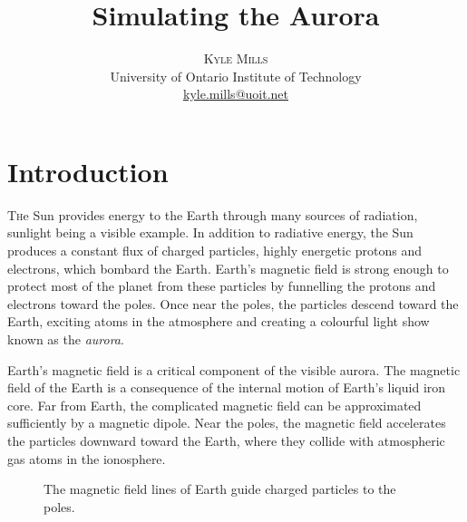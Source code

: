 \documentclass[twocolumn]{article}
\title{\vspace{-15mm}\fontsize{20pt}{10pt}\selectfont\textbf{Simulating the Aurora}} %
\author{
\large
\textsc{Kyle Mills}\\[2mm] %
\normalsize University of Ontario Institute of Technology \\ %
\normalsize \href{mailto:kyle.mills@uoit.net}{kyle.mills@uoit.net} %
\vspace{-5mm}
}
\date{}
\renewcommand{\insertfigure}[3]{\begin{figure}[tbh]
\centering
	\makebox[\columnwidth][c]{
	\texttt{[image: \#1]}
	}
\caption{#3}
\label{#1}
\end{figure}}
\begin{document}
\thispagestyle{fancy} %







\section*{Introduction}
\lettrine[nindent=0em,lines=2]{T}he Sun provides energy to the Earth through many sources of radiation, sunlight being a visible example.  In addition to radiative energy, the Sun produces a constant flux of charged particles, highly energetic protons and electrons, which bombard the Earth.  Earth's magnetic field is strong enough to protect most of the planet from these particles by funnelling the protons and electrons toward the poles.  Once near the poles, the particles descend toward the Earth, exciting atoms in the atmosphere and creating a colourful light show known as the \emph{aurora}.

Earth's magnetic field is a critical component of the visible aurora.  The magnetic field of the Earth is a consequence of the internal motion of Earth's liquid iron core.  Far from Earth, the complicated magnetic field can be approximated sufficiently by a magnetic dipole\cite{Enns2010}.  Near the poles, the magnetic field accelerates the particles downward toward the Earth, where they collide with atmospheric gas atoms in the ionosphere. \insertfigure{../presentation/img/fieldlines.pdf}{0.8}{The magnetic field lines of Earth guide charged particles to the poles.}
\end{document}

